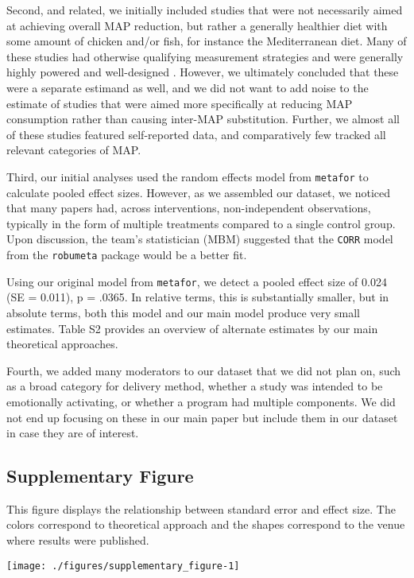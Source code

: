 \documentclass[sn-nature,referee,pdflatex]{sn-jnl}
\begin{document}
Second, and related, we initially included studies that were not
necessarily aimed at achieving overall MAP reduction, but rather a
generally healthier diet with some amount of chicken and/or fish, for
instance the Mediterranean diet. Many of these studies had otherwise
qualifying measurement strategies and were generally highly powered and
well-designed \citep{beresford2006}. However, we ultimately concluded
that these were a separate estimand as well, and we did not want to add
noise to the estimate of studies that were aimed more specifically at
reducing MAP consumption rather than causing inter-MAP substitution.
Further, we almost all of these studies featured self-reported data, and
comparatively few tracked all relevant categories of MAP.

Third, our initial analyses used the random effects model from
\texttt{metafor} to calculate pooled effect sizes. However, as we
assembled our dataset, we noticed that many papers had, across
interventions, non-independent observations, typically in the form of
multiple treatments compared to a single control group. Upon discussion,
the team's statistician (MBM) suggested that the \texttt{CORR} model
from the \texttt{robumeta} package would be a better fit.

Using our original model from \texttt{metafor}, we detect a pooled
effect size of 0.024 (SE = 0.011), p = .0365. In relative terms, this is
substantially smaller, but in absolute terms, both this model and our
main model produce very small estimates. Table S2 provides an overview
of alternate estimates by our main theoretical approaches.

Fourth, we added many moderators to our dataset that we did not plan on,
such as a broad category for delivery method, whether a study was
intended to be emotionally activating, or whether a program had multiple
components. We did not end up focusing on these in our main paper but
include them in our dataset in case they are of interest.

\subsection{Supplementary Figure}\label{sec5.2}

This figure displays the relationship between standard error and effect
size. The colors correspond to theoretical approach and the shapes
correspond to the venue where results were published.

\texttt{[image: ./figures/supplementary\_figure-1]}
\end{document}
